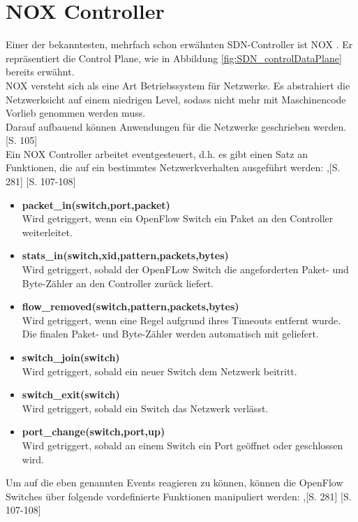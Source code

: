 \documentclass[10pt,conference]{IEEEtran}
\begin{document}
\section{NOX Controller}
Einer der bekanntesten, mehrfach schon erwähnten SDN-Controller ist NOX \cite{8}. Er repräsentiert die Control Plane, wie in Abbildung \ref{fig:SDN_controlDataPlane} bereits erwähnt.\\
NOX versteht sich als eine Art Betriebssystem für Netzwerke. Es abstrahiert die Netzwerksicht auf einem niedrigen Level, sodass nicht mehr mit Maschinencode Vorlieb genommen werden muss.\\
Darauf aufbauend können Anwendungen für die Netzwerke geschrieben werden. \cite{8}[S. 105]\\
Ein NOX Controller arbeitet eventgesteuert, d.h. es gibt einen Satz an Funktionen, die auf ein bestimmtes Netzwerkverhalten ausgeführt werden: \cite{4},[S. 281] \cite{8}[S. 107-108]
\begin{itemize}
	\item \textbf{packet\_in(switch,port,packet)}\\
	Wird getriggert, wenn ein OpenFlow Switch ein Paket an den Controller weiterleitet.
	\item \textbf{stats\_in(switch,xid,pattern,packets,bytes)}\\
	Wird getriggert, sobald der OpenFLow Switch die angeforderten Paket- und Byte-Zähler an den Controller zurück liefert.
	\item \textbf{flow\_removed(switch,pattern,packets,bytes)}\\
	Wird getriggert, wenn eine Regel aufgrund ihres Timeouts entfernt wurde. Die finalen Paket- und Byte-Zähler werden automatisch mit geliefert.
	\item \textbf{switch\_join(switch)}\\
	Wird getriggert, sobald ein neuer Switch dem Netzwerk beitritt.
	\item \textbf{switch\_exit(switch)}\\
	Wird getriggert, sobald ein Switch das Netzwerk verlässt.
	\item \textbf{port\_change(switch,port,up)}\\
	Wird getriggert, sobald an einem Switch ein Port geöffnet oder geschlossen wird.
\end{itemize}
Um auf die eben genannten Events reagieren zu können, können die OpenFlow Switches über folgende vordefinierte Funktionen manipuliert werden: \cite{4},[S. 281] \cite{8}[S. 107-108]
\end{document}
